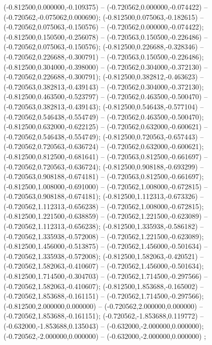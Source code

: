  (-0.812500,0.000000,-0.109375) -- (-0.720562,0.000000,-0.074422) -- (-0.720562,-0.075062,0.000690);
 (-0.812500,0.075063,-0.182615) -- (-0.720562,0.075063,-0.150576) -- (-0.720562,0.000000,-0.074422);
 (-0.812500,0.150500,-0.256078) -- (-0.720563,0.150500,-0.226486) -- (-0.720562,0.075063,-0.150576);
 (-0.812500,0.226688,-0.328346) -- (-0.720562,0.226688,-0.300791) -- (-0.720563,0.150500,-0.226486);
 (-0.812500,0.304000,-0.398000) -- (-0.720562,0.304000,-0.372130) -- (-0.720562,0.226688,-0.300791);
 (-0.812500,0.382812,-0.463623) -- (-0.720563,0.382813,-0.439143) -- (-0.720562,0.304000,-0.372130);
 (-0.812500,0.463500,-0.523797) -- (-0.720562,0.463500,-0.500470) -- (-0.720563,0.382813,-0.439143);
 (-0.812500,0.546438,-0.577104) -- (-0.720562,0.546438,-0.554749) -- (-0.720562,0.463500,-0.500470);
 (-0.812500,0.632000,-0.622125) -- (-0.720562,0.632000,-0.600621) -- (-0.720562,0.546438,-0.554749);
 (-0.812500,0.720563,-0.657443) -- (-0.720562,0.720563,-0.636724) -- (-0.720562,0.632000,-0.600621);
 (-0.812500,0.812500,-0.681641) -- (-0.720563,0.812500,-0.661697) -- (-0.720562,0.720563,-0.636724);
 (-0.812500,0.908188,-0.693299) -- (-0.720563,0.908188,-0.674181) -- (-0.720563,0.812500,-0.661697);
 (-0.812500,1.008000,-0.691000) -- (-0.720562,1.008000,-0.672815) -- (-0.720563,0.908188,-0.674181);
 (-0.812500,1.112313,-0.673326) -- (-0.720562,1.112313,-0.656238) -- (-0.720562,1.008000,-0.672815);
 (-0.812500,1.221500,-0.638859) -- (-0.720562,1.221500,-0.623089) -- (-0.720562,1.112313,-0.656238);
 (-0.812500,1.335938,-0.586182) -- (-0.720562,1.335938,-0.572008) -- (-0.720562,1.221500,-0.623089);
 (-0.812500,1.456000,-0.513875) -- (-0.720562,1.456000,-0.501634) -- (-0.720562,1.335938,-0.572008);
 (-0.812500,1.582063,-0.420521) -- (-0.720562,1.582063,-0.410607) -- (-0.720562,1.456000,-0.501634);
 (-0.812500,1.714500,-0.304703) -- (-0.720562,1.714500,-0.297566) -- (-0.720562,1.582063,-0.410607);
 (-0.812500,1.853688,-0.165002) -- (-0.720562,1.853688,-0.161151) -- (-0.720562,1.714500,-0.297566);
 (-0.812500,2.000000,0.000000) -- (-0.720562,2.000000,0.000000) -- (-0.720562,1.853688,-0.161151);
 (-0.720562,-1.853688,0.119772) -- (-0.632000,-1.853688,0.135043) -- (-0.632000,-2.000000,0.000000);
 (-0.720562,-2.000000,0.000000) -- (-0.632000,-2.000000,0.000000) ;
